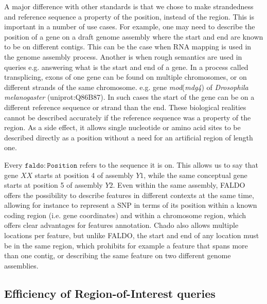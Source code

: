 A major difference with other standards is that we chose to make strandedness and reference sequence a property of the position, instead of the region.
This is important in a number of use cases.
For example, one may need to describe the position of a gene on a draft genome assembly where the start and end are known to be on different contigs.
This can be the case when RNA mapping is used in the genome assembly process.
Another is when rough semantics are used in queries e.g. answering what is the start and end of a gene. 
In a process called transplicing, exons of one gene can be found on multiple chromosomes, or on different strands of the same chromosome.
e.g.  gene \textit{mod}(\textit{mdg4}) of \textit{Drosophila melanogaster} (uniprot:Q86B87).
In such cases the start of the gene can be on a different reference sequence or strand than the end.
These biological realities cannot be described accurately if the reference sequence was a property of the region. 
As a side effect, it allows single nucleotide or amino acid sites to be described directly as a position without a need for an artificial region of length one.


Every $\mathtt{faldo\colon{}Position}$ refers to the sequence it is on.
This allows us to say that gene $XX$ starts at position 4 of assembly $Y1$,
while the same conceptual gene starts at position 5 of assembly $Y2$.
Even within the same assembly, FALDO offers the possibility to describe features in different contexts at the same time, allowing for instance to represent a SNP in terms of its position within a known coding region (i.e. gene coordinates) and within a chromosome region, which offers clear advantages for features annotation.
Chado also allows multiple locations per feature, but unlike FALDO,
the start and end of any location must be in the same region,
which prohibits for example a feature that spans more than one contig,
or describing the same feature on two different genome assemblies.

\subsection*{Efficiency of Region-of-Interest queries}


